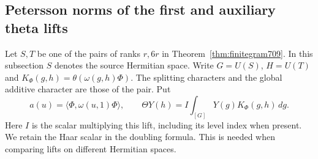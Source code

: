 \documentclass[a4paper,11pt]{article}
\theoremstyle{definition}
\theoremstyle{remark}
\numberwithin{equation}{section}
\begin{document}
\subsection{Petersson norms of the first and auxiliary theta lifts}
\label{sec:firstgram711}

Let \(S,T\) be one of the pairs of ranks \(r,6r\) in
Theorem~\ref{thm:finitegram709}. In this subsection \(S\)
denotes the source Hermitian space. Write \(G=U(S)\),
\(H=U(T)\) and \(K_\Phi(g,h)=\theta(\omega(g,h)\Phi)\).
The splitting characters and the global additive character
are those of the pair. Put
\[
 a(u)=\langle\Phi,\omega(u,1)\Phi\rangle,\qquad
 \Theta Y(h)=I\int_{[G]}Y(g)K_\Phi(g,h)\,dg .
\]
Here \(I\) is the scalar multiplying this lift, including
its level index when present. We retain the Haar scalar in
the doubling formula. This is needed when comparing lifts
on different Hermitian spaces.
\end{document}
